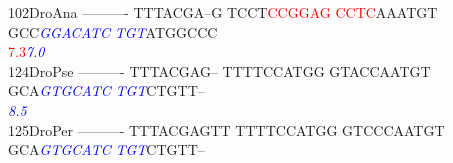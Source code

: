 \documentclass[11pt,twoside,reqno,a4paper]{article}
\begin{document}
{102\hspace*{1\charwidth}DroAna	----------	TTTACGA--G	TCCT\textcolor{Red}{C}\textcolor{Red}{C}\textcolor{Red}{G}\textcolor{Red}{G}\textcolor{Red}{A}\textcolor{Red}{G}	\textcolor{Red}{C}\textcolor{Red}{C}\textcolor{Red}{T}\textcolor{Red}{C}AAATGT	GCC\textit{\textcolor{Blue}{G}}\textit{\textcolor{Blue}{G}}\textit{\textcolor{Blue}{A}}\textit{\textcolor{Blue}{C}}\textit{\textcolor{Blue}{A}}\textit{\textcolor{Blue}{T}}\textit{\textcolor{Blue}{C}}	\textit{\textcolor{Blue}{T}}\textit{\textcolor{Blue}{G}}\textit{\textcolor{Blue}{T}}ATGGCCC	\\
\hspace*{4\charwidth}\hspace*{7\charwidth}\hspace*{1\charwidth}\hspace*{1\charwidth}\hspace*{24\charwidth}\textcolor{Red}{7.3}\hspace*{1\charwidth}\hspace*{1\charwidth}\hspace*{16\charwidth}\textit{\textcolor{Blue}{7.0}}\hspace*{1\charwidth}\hspace*{1\charwidth}\\
124\hspace*{1\charwidth}DroPse	----------	TTTACGAG--	TTTTCCATGG	GTACCAATGT	GCA\textit{\textcolor{Blue}{G}}\textit{\textcolor{Blue}{T}}\textit{\textcolor{Blue}{G}}\textit{\textcolor{Blue}{C}}\textit{\textcolor{Blue}{A}}\textit{\textcolor{Blue}{T}}\textit{\textcolor{Blue}{C}}	\textit{\textcolor{Blue}{T}}\textit{\textcolor{Blue}{G}}\textit{\textcolor{Blue}{T}}CTGTT--	\\
\hspace*{4\charwidth}\hspace*{7\charwidth}\hspace*{1\charwidth}\hspace*{1\charwidth}\hspace*{1\charwidth}\hspace*{1\charwidth}\hspace*{43\charwidth}\textit{\textcolor{Blue}{8.5}}\hspace*{1\charwidth}\hspace*{1\charwidth}\\
125\hspace*{1\charwidth}DroPer	----------	TTTACGAGTT	TTTTCCATGG	GTCCCAATGT	GCA\textit{\textcolor{Blue}{G}}\textit{\textcolor{Blue}{T}}\textit{\textcolor{Blue}{G}}\textit{\textcolor{Blue}{C}}\textit{\textcolor{Blue}{A}}\textit{\textcolor{Blue}{T}}\textit{\textcolor{Blue}{C}}	\textit{\textcolor{Blue}{T}}\textit{\textcolor{Blue}{G}}\textit{\textcolor{Blue}{T}}CTGTT--	\\
}
\end{document}
